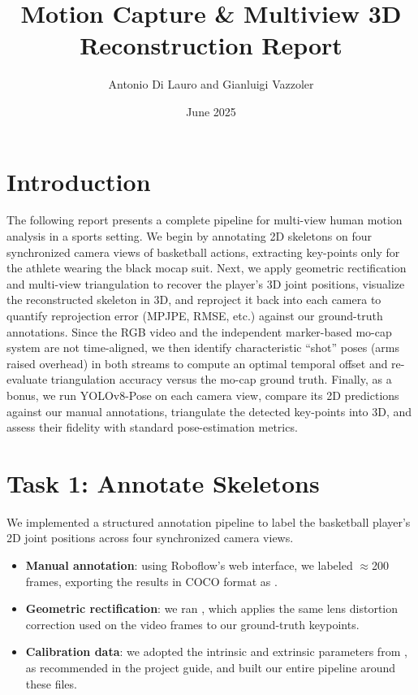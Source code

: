 \documentclass[11pt,a4paper]{article}
\title{Motion Capture \& Multiview 3D Reconstruction Report}
\author{Antonio Di Lauro and Gianluigi Vazzoler}
\date{June 2025}
\begin{document}
\maketitle

\section*{Introduction}
The following report presents a complete pipeline for multi-view human motion analysis in a sports setting. We begin by annotating 2D skeletons on four synchronized camera views of basketball actions, extracting key-points only for the athlete wearing the black mocap suit. Next, we apply geometric rectification and multi-view triangulation to recover the player’s 3D joint positions, visualize the reconstructed skeleton in 3D, and reproject it back into each camera to quantify reprojection error (MPJPE, RMSE, etc.) against our ground-truth annotations. Since the RGB video and the independent marker-based mo-cap system are not time-aligned, we then identify characteristic “shot” poses (arms raised overhead) in both streams to compute an optimal temporal offset and re-evaluate triangulation accuracy versus the mo-cap ground truth. Finally, as a bonus, we run YOLOv8-Pose on each camera view, compare its 2D predictions against our manual annotations, triangulate the detected key-points into 3D, and assess their fidelity with standard pose-estimation metrics.

\section*{Task 1: Annotate Skeletons}
We implemented a structured annotation pipeline to label the basketball player’s 2D joint positions across four synchronized camera views.  

\begin{itemize}
  \item \textbf{Manual annotation}: using Roboflow’s web interface, we labeled $\approx$200 frames, exporting the results in COCO format as .
  \item \textbf{Geometric rectification}: we ran , which applies the same lens distortion correction used on the video frames to our ground-truth keypoints.
  \item \textbf{Calibration data}: we adopted the intrinsic and extrinsic parameters from , as recommended in the project guide, and built our entire pipeline around these files.
\end{itemize}
\end{document}
